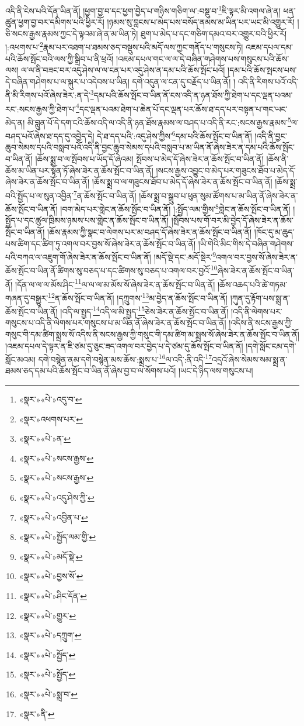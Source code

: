 འདི་ནི་ངེས་པའི་དོན་ཡིན་ནོ། །ཕྱག་བྱ་བ་དང་ཕྱག་བྱེད་པ་གཉིས་གཅིག་ལ་:བསྡུ་བ་\footnote{«སྣར་»«པེ་»འདུ་བ་}ཇི་ལྟར་མི་འགལ་ཞེ་ན། ཕན་ཚུན་ཕྱག་བྱ་བར་དམིགས་པའི་ཕྱིར་རོ། །ཉམས་སུ་བླངས་པ་མེད་པས་བསོད་ནམས་མ་ཡིན་པར་ཡང་མི་འགྱུར་རོ། །ཅི་སངས་རྒྱས་རྣམས་ཀྱང་དེ་ལྟའམ་ཞེ་ན་མ་ཡིན་ཏེ། ཐུག་པ་མེད་པ་དང་གཅིག་དམའ་བར་འགྱུར་བའི་ཕྱིར་རོ། །:འཕགས་པ་\footnote{«སྣར་»འཕགས་པར་}རྣམ་པར་འཐག་པ་ཐམས་ཅད་བསྡུས་པའི་མདོ་ལས་ཀྱང་གནོད་པ་གསུངས་ཏེ། འཇམ་དཔལ་དམ་པའི་ཆོས་སྤོང་བའི་ལས་ཀྱི་སྒྲིབ་པ་ནི་ཕྲའོ། །འཇམ་དཔལ་གང་ལ་ལ་དེ་བཞིན་གཤེགས་པས་གསུངས་པའི་ཆོས་ལས། ལ་ལ་ནི་བཟང་བར་འདུ་ཤེས་ལ་ལ་ངན་པར་འདུ་ཤེས་ན་དམ་པའི་ཆོས་སྤོང་པའོ། །དམ་པའི་ཆོས་སྤངས་པས་དེ་བཞིན་གཤེགས་པ་ལ་སྐུར་པ་འདེབས་པ་ཡིན། དགེ་འདུན་ལ་ངན་དུ་བརྗོད་པ་ཡིན་ནོ། །
འདི་ནི་རིགས་པའོ་འདི་ནི་མི་རིགས་པའོ་ཞེས་ཟེར་:ན་དེ་\footnote{«སྣར་»«པེ་»ན་}དམ་པའི་ཆོས་སྤོང་བ་ཡིན་ནོ་ངས་འདི་ན་ཉན་ཐོས་ཀྱི་ཐེག་པ་དང་ལྡན་པའམ་རང་:སངས་རྒྱས་ཀྱི་ཐེག་པ་\footnote{«སྣར་»«པེ་»སངས་རྒྱས་}དང་ལྡན་པའམ་ཐེག་པ་ཆེན་པོ་དང་ལྡན་པར་ཆོས་ཐ་དད་པར་བསྟན་པ་གང་ཡང་མེད་ན། མི་བླུན་པོ་དེ་དག་ངའི་ཆོས་འདི་ལ་འདི་ནི་ཉན་ཐོས་རྣམས་ལ་བཤད་པ་འདི་ནི་རང་:སངས་རྒྱས་རྣམས་\footnote{«སྣར་»«པེ་»སངས་རྒྱས་}ལ་བཤད་པའོ་ཞེས་ཐ་དད་དུ་འབྱེད་དེ། དེ་ཐ་དད་པའི་:འདུ་ཤེས་ཀྱིས་\footnote{«སྣར་»«པེ་»འདུ་ཤེས་ཀྱི་}དམ་པའི་ཆོས་སྤོང་བ་ཡིན་ནོ། །འདི་ནི་བྱང་ཆུབ་སེམས་དཔའི་བསླབ་པའོ་འདི་ནི་བྱང་ཆུབ་སེམས་དཔའི་བསླབ་པ་མ་ཡིན་ནོ་ཞེས་ཟེར་ན་དམ་པའི་ཆོས་སྤོང་བ་ཡིན་ནོ། །ཆོས་སྨྲ་བ་ལ་སྤོབས་པ་ཡོད་དོ་ཞེའམ། སྤོབས་པ་མེད་དོ་ཞེས་ཟེར་ན་ཆོས་སྤོང་བ་ཡིན་ནོ། །ཆོས་ནི་ཆོས་མ་ཡིན་པར་སྟོན་ཏོ་ཞེས་ཟེར་ན་ཆོས་སྤོང་བ་ཡིན་ནོ། །སངས་རྒྱས་འབྱུང་བ་མེད་པར་གཟུངས་ཐོབ་པ་མེད་དོ་ཞེས་ཟེར་ན་ཆོས་སྤོང་བ་ཡིན་ནོ། །ཆོས་སྨྲ་བ་ལ་གཟུངས་ཐོབ་པ་མེད་དོ་ཞེས་ཟེར་ན་ཆོས་སྤོང་བ་ཡིན་ནོ། །ཆོས་སྨྲ་བའི་སྤྱོད་པ་ལ་སུན་འབྱིན་\footnote{«སྣར་»«པེ་»འབྱིན་པ་}ན་ཆོས་སྤོང་བ་ཡིན་ནོ། །ཆོས་སྨྲ་བ་སྒྲུབ་པ་ཕུན་སུམ་ཚོགས་པ་མ་ཡིན་ནོ་ཞེས་ཟེར་ན་ཆོས་སྤོང་བ་ཡིན་ནོ། །བག་མེད་པར་གླེང་ན་ཆོས་སྤོང་བ་ཡིན་ནོ། །:སྤྱོད་ལམ་གྱིས་\footnote{«སྣར་»«པེ་»སྤྱོད་ལམ་གྱི་}གླེང་ན་ཆོས་སྤོང་བ་ཡིན་ནོ། །སྤྱོད་པ་དང་ཚུལ་ཁྲིམས་ཉམས་པས་གླེང་ན་ཆོས་སྤོང་བ་ཡིན་ནོ། །སྤོབས་པས་གོ་བར་མི་བྱེད་དོ་ཞེས་ཟེར་ན་ཆོས་སྤོང་བ་ཡིན་ནོ། །ཆོས་རྣམས་ཀྱི་སྣང་བ་ལེགས་པར་མ་བཤད་དོ་ཞེས་ཟེར་ན་ཆོས་སྤོང་བ་ཡིན་ནོ། །ཁོང་དུ་མ་ཆུད་པས་ཚིག་དང་ཚིག་ཏུ་འགལ་བར་བྱས་སོ་ཞེས་ཟེར་ན་ཆོས་སྤོང་བ་ཡིན་ནོ། །ཡི་གེའི་མིང་གིས་དེ་བཞིན་གཤེགས་པའི་བཀའ་ལ་འཇུག་གོ་ཞེས་ཟེར་ན་ཆོས་སྤོང་བ་ཡིན་ནོ། །མདོ་སྡེ་དང་:མདོ་སྡེར་\footnote{«སྣར་»«པེ་»མདོ་སྡེ་}འགལ་བར་བྱས་སོ་ཞེས་ཟེར་ན་ཆོས་སྤོང་བ་ཡིན་ནོ་ཚིགས་སུ་བཅད་པ་དང་ཚིགས་སུ་བཅད་པ་འགལ་བར་བྱའོ་\footnote{«སྣར་»«པེ་»བྱས་སོ་}ཞེས་ཟེར་ན་ཆོས་སྤོང་བ་ཡིན་ནོ། །དོན་ལ་ལ་ལ་མོས་ཤིང་\footnote{«སྣར་»«པེ་»ཤིང་དོན་}ལ་ལ་ལ་མ་མོས་སོ་ཞེས་ཟེར་ན་ཆོས་སྤོང་བ་ཡིན་ནོ། །ཆོས་འཆད་པའི་ཚེ་གཏམ་གཞན་དུ་བསྒྱུར་\footnote{«སྣར་»«པེ་»གྱུར་}ན་ཆོས་སྤོང་བ་ཡིན་ནོ། །དཀྲུགས་\footnote{«སྣར་»«པེ་»དཀྲུག་}མ་བྱེད་ན་ཆོས་སྤོང་བ་ཡིན་ནོ། །ཀུན་དུ་རྟོག་པས་སྨྲ་ན་ཆོས་སྤོང་བ་ཡིན་ནོ། །འདི་ལ་སྤྱད་\footnote{«སྣར་»«པེ་»སྤྱོད་}འདི་ལ་མི་སྤྱད་\footnote{«སྣར་»«པེ་»སྤྱོད་}ཅེས་ཟེར་ན་ཆོས་སྤོང་བ་ཡིན་ནོ། །འདི་ནི་ལེགས་པར་གསུངས་པ་འདི་ནི་ལེགས་པར་གསུངས་པ་མ་ཡིན་ནོ་ཞེས་ཟེར་ན་ཆོས་སྤོང་བ་ཡིན་ནོ། །འདིས་ནི་སངས་རྒྱས་ཀྱི་གསུང་གི་དམ་ཚིག་སྨྲས་སོ་འདིས་ནི་སངས་རྒྱས་ཀྱི་གསུང་གི་དམ་ཚིག་མ་སྨྲས་སོ་ཞེས་ཟེར་ན་ཆོས་སྤོང་བ་ཡིན་ནོ། །འཇམ་དཔལ་དེ་ལྟར་ན་ཇི་ཙམ་དུ་ཅུང་ཟད་འགལ་བར་བྱེད་པ་དེ་ཙམ་དུ་ཆོས་སྤོང་བ་ཡིན་ནོ། །དགེ་སློང་ངམ་དགེ་སློང་མའམ། དགེ་བསྙེན་ནམ་དགེ་བསྙེན་མས་ཆོས་:སྨྲས་པ་\footnote{«སྣར་»«པེ་»སྨྲ་བ་}ལ་འདི་:ནི་འདི་\footnote{«སྣར་»ནི་}འདྲའོ་ཞེས་སེམས་སམ་སྨྲ་ན་ཐམས་ཅད་དམ་པའི་ཆོས་སྤོང་བ་ཡིན་ནོ་ཞེས་བྱ་བ་ལ་སོགས་པའོ། །ཡང་དེ་ཉིད་ལས་གསུངས་པ། 